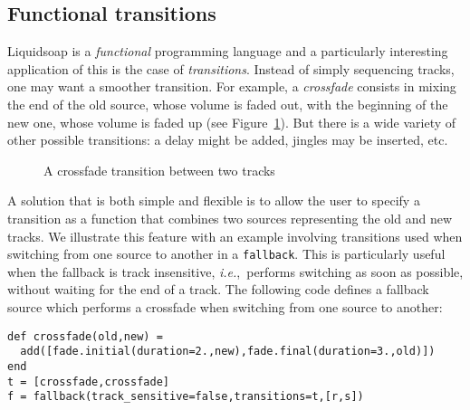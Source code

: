 \documentclass{llncs}
\newcommand{\liquidsoap}{Liquidsoap}
\newcommand{\ie}{\emph{i.e.},}
\newcommand{\fcaption}[1]{\vspace{-3ex}\caption{#1}\vspace{-4ex}}
\begin{document}
\subsection{Functional transitions}
\label{sec:transitions}

\liquidsoap{} is a \emph{functional} programming language and a particularly
interesting application of this is the case of \textit{transitions}.
Instead of simply sequencing tracks, one may want a smoother transition.
For example, a \emph{crossfade} consists in mixing the end of the old source,
whose volume is faded out, with the
beginning of the new one, whose volume is faded up (see Figure~\ref{fig:cross}).
But there is a wide variety of other possible transitions:
a delay might be added, jingles may be inserted, etc.

\begin{figure}[h]
 \begin{center}
\end{center}
 \fcaption{A crossfade transition between two tracks}
 \label{fig:cross}
\end{figure}

A solution that is both simple and flexible is to allow the user
to specify a transition as a function that combines two sources
representing the old and new tracks.
%
We illustrate this feature with an example involving transitions
used when switching from one source to another in a \verb.fallback..
This is particularly useful when the fallback is track insensitive,
\ie\ performs switching as soon as possible,
  without waiting for the end of a track.
The following code defines a fallback source which performs a crossfade when
switching from one source to another:
\begin{verbatim}
def crossfade(old,new) =
  add([fade.initial(duration=2.,new),fade.final(duration=3.,old)])
end
t = [crossfade,crossfade]
f = fallback(track_sensitive=false,transitions=t,[r,s])
\end{verbatim}
\end{document}
